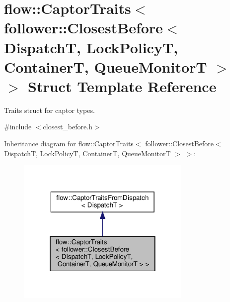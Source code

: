 \hypertarget{structflow_1_1_captor_traits_3_01follower_1_1_closest_before_3_01_dispatch_t_00_01_lock_policy_t8b834bc2517b16c76af22e1a13353500}{}\section{flow\+:\+:Captor\+Traits$<$ follower\+:\+:Closest\+Before$<$ DispatchT, Lock\+PolicyT, ContainerT, Queue\+MonitorT $>$ $>$ Struct Template Reference}
\label{structflow_1_1_captor_traits_3_01follower_1_1_closest_before_3_01_dispatch_t_00_01_lock_policy_t8b834bc2517b16c76af22e1a13353500}


Traits struct for captor types.  




{\ttfamily \#include $<$closest\+\_\+before.\+h$>$}



Inheritance diagram for flow\+:\+:Captor\+Traits$<$ follower\+:\+:Closest\+Before$<$ DispatchT, Lock\+PolicyT, ContainerT, Queue\+MonitorT $>$ $>$\+:
\nopagebreak
\begin{figure}[H]
\begin{center}
\leavevmode
\includegraphics[width=238pt]{structflow_1_1_captor_traits_3_01follower_1_1_closest_before_3_01_dispatch_t_00_01_lock_policy_td890bbd5f0d590aef7cd8d5b40ba8ec5}
\end{center}
\end{figure}


